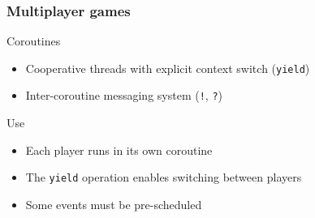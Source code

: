 \documentclass{beamer}
\newcommand{\<}[1]{\`#1}
\begin{document}
\begin{frame}
  \frametitle{Multiplayer games}

  \begin{block}{Coroutines}
    \begin{itemize}
    \item Cooperative threads with explicit context switch
      (\texttt{yield})
    \item Inter-coroutine messaging system (\texttt{!}, \texttt{?})
    \end{itemize}
  \end{block}

  \begin{block}{Use}
    \begin{itemize}
    \item Each player runs in its own coroutine
    \item The \texttt{yield} operation enables switching between players
    \item Some events must be pre-scheduled 
    \end{itemize}
  \end{block}
\end{frame}
\end{document}
